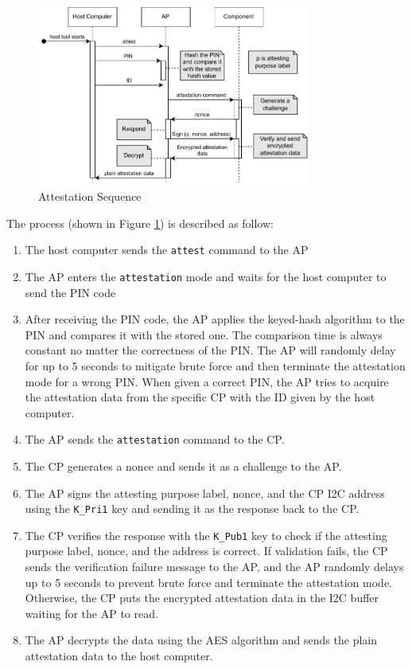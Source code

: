 \documentclass[11pt,oneside,onecolumn,letterpaper]{article}
\newcounter{alg}
\begin{document}
	\begin{figure}[h]
		\centering
		\includegraphics[width=0.8\textwidth]{pics/attest.pdf}
		\caption{Attestation Sequence}
		\label{fig:functionality_attest}
	\end{figure}
	
	The process (shown in Figure \ref{fig:functionality_attest}) is described as follow:
	\begin{enumerate}
		\item The host computer sends the \texttt{attest} command to the AP
		\item The AP enters the \texttt{attestation} mode and waits for the host computer to send the PIN code
		\item After receiving the PIN code,
		the AP applies the keyed-hash algorithm to the PIN and compares it with the stored one.
		The comparison time is always constant no matter the correctness of the PIN.
		The AP will randomly delay for up to 5 seconds to mitigate brute force and then terminate the attestation mode for a wrong PIN.
		When given a correct PIN,
		the AP tries to acquire the attestation data from the specific CP with the ID given by the host computer.
		\item The AP sends the \texttt{attestation} command to the CP.
		\item The CP generates a nonce and sends it as a challenge to the AP.
		\item The AP signs the attesting purpose label,
		nonce,
		and the CP I2C address using the \texttt{K\_Pri1} key and sending it as the response back to the CP.
		\item The CP verifies the response with the \texttt{K\_Pub1} key to check if the attesting purpose label,
		nonce,
		and the address is correct.
		If validation fails,
		the CP sends the verification failure message to the AP,
		and the AP randomly delays up to 5 seconds to prevent brute force and terminate the attestation mode.
		Otherwise,
		the CP puts the encrypted attestation data in the I2C buffer waiting for the AP to read.
		\item The AP decrypts the data using the AES algorithm and sends the plain attestation data to the host computer.
	\end{enumerate}
	
\end{document}
